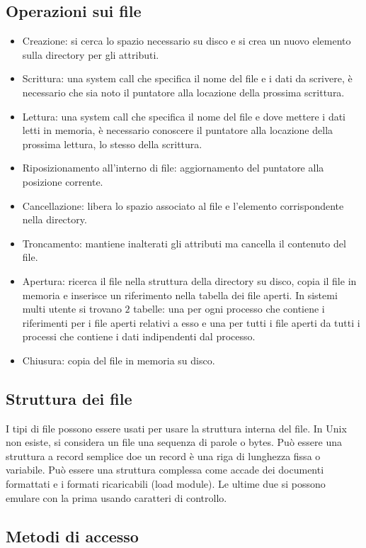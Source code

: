 \subsection{Operazioni sui file}
\begin{itemize}
	\item Creazione: si cerca lo spazio necessario su disco e si crea un nuovo elemento sulla directory per gli attributi.
	\item Scrittura: una system call che specifica il nome del file e i dati da scrivere, \`e necessario che sia noto il puntatore alla locazione della prossima scrittura.
	\item Lettura: una system call che specifica il nome del file e dove mettere i dati letti in memoria, \`e necessario conoscere il puntatore alla locazione della prossima
		lettura, lo stesso della scrittura. 
	\item Riposizionamento all'interno di file: aggiornamento del puntatore alla posizione corrente.
	\item Cancellazione: libera lo spazio associato al file e l'elemento corrispondente nella directory. 
	\item Troncamento: mantiene inalterati gli attributi ma cancella il contenuto del file. 
	\item Apertura: ricerca il file nella struttura della directory su disco, copia il file in memoria e inserisce un riferimento nella tabella dei file aperti. In sistemi 
		multi utente si trovano $2$ tabelle: una per ogni processo che contiene i riferimenti per i file aperti relativi a esso e una per tutti i file aperti da tutti i 
		processi che contiene i dati indipendenti dal processo. 
	\item Chiusura: copia del file in memoria su disco. 
\end{itemize}
\subsection{Struttura dei file}
I tipi di file possono essere usati per usare la struttura interna del file. In Unix non esiste, si considera un file una sequenza di parole o bytes. Pu\`o essere una struttura a 
record semplice doe un record \`e una riga di lunghezza fissa o variabile. Pu\`o essere una struttura complessa come accade dei documenti formattati e i formati ricaricabili (load
module). Le ultime due si possono emulare con la prima usando caratteri di controllo. 
\subsection{Metodi di accesso}
